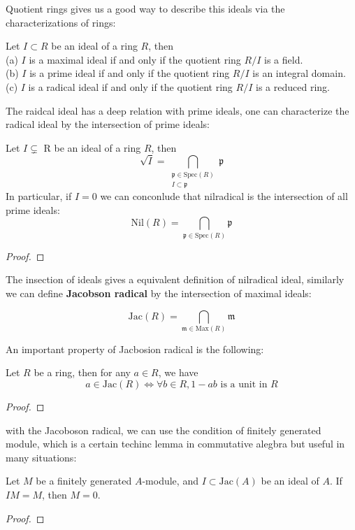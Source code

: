Quotient rings gives us a good way to describe this ideals via the characterizations of rings:
\begin{proposition}
    Let \(I \subset R\) be an ideal of a ring \(R\), then\\
    (a) \(I\) is a maximal ideal if and only if the quotient ring \(R/I\) is a field.\\

    (b) \(I\) is a prime ideal if and only if the quotient ring \(R/I\) is an integral domain.\\

    (c) \(I\) is a radical ideal if and only if the quotient ring \(R/I\) is a reduced ring.\\
\end{proposition}

The raidcal ideal has a deep relation with prime ideals, one can characterize the radical ideal by the intersection of prime ideals:

\begin{lemma}
    Let \(I \subsetneq\) R be an ideal of a ring \(R\), then 
    \[\sqrt{I} = \bigcap_{\substack{\mathfrak{p} \in \mathrm{Spec}(R) \\ I \subset \mathfrak{p}}} \mathfrak{p}\]
    In particular, if \(I = 0\) we can conconlude that nilradical is the intersection of all prime ideals:
    \[\mathrm{Nil}(R) = \bigcap_{\mathfrak{p} \in \mathrm{Spec}(R)} \mathfrak{p}\]
\end{lemma}
\begin{proof}
    
\end{proof}

The insection of ideals gives a equivalent definition of nilradical ideal, similarly we can define \textbf{Jacobson radical} by the intersection of maximal ideals:

\[\mathrm{Jac}(R) = \bigcap_{\mathfrak{m} \in \mathrm{Max}(R)} \mathfrak{m}\]

An important property of Jacbosion radical is the following:
\begin{lemma}
    Let \(R\) be a ring, then for any \(a \in R\), we have
    \[a \in \mathrm{Jac}(R) \iff \forall b \in R, 1 - ab \text{ is a unit in } R\]
\end{lemma}

\begin{proof}
    
\end{proof}

with the Jacoboson radical, we can use the condition of finitely generated module, which is a certain techinc lemma in commutative alegbra but useful in many situations:
\begin{theorem}[Nakayama] \label{Nakayama}
    Let \(M\) be a finitely generated \(A\)-module, and \(I \subset \mathrm{Jac}(A)\) be an ideal of \(A\). If \(IM = M\), then \(M = 0\).
\end{theorem}
\begin{proof}
    
\end{proof}

